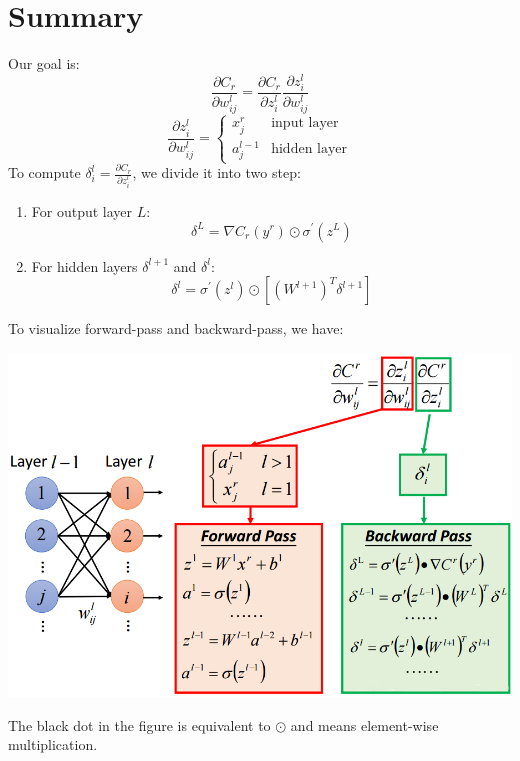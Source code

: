 \documentclass{article}
\begin{document}
\section{Summary}
Our goal is:
\[
\frac{\partial C_r}{\partial w^l_{ij}} = \frac{\partial C_r}{\partial z^l_i}\frac{\partial z^l_i}{\partial w^l_{ij}}
\]
\[
\frac{\partial z^l_i}{\partial w^l_{ij}}
=
\begin{cases}
x^r_j & \textrm{input layer}\\
a^{l-1}_j & \textrm{hidden layer}
\end{cases}
\]
To compute $\delta^l_i = \frac{\partial C_r}{\partial z^l_i}$, we divide it into two step:
\begin{enumerate}
\item
For output layer $L$:
\[
\delta^L = \nabla C_r(y^r)\odot \sigma^\prime(z^L)
\]
\item
For hidden layers $\delta^{l+1}$ and $\delta^l$:
\[
\delta^l = \sigma^\prime(z^l)\odot [(W^{l+1})^T\delta^{l+1}]
\]
\end{enumerate}
To visualize forward-pass and backward-pass, we have:
\begin{center}
\includegraphics[scale=0.35]{summary}
\end{center}
The black dot in the figure is equivalent to $\odot$ and means element-wise multiplication.
\end{document}
